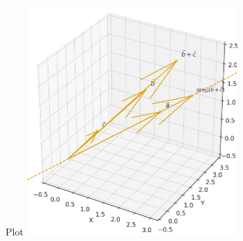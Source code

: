 \documentclass{beamer}
\begin{document}
\begin{frame}{Plot}
    \centering
    \includegraphics[width=\columnwidth, height=0.8\textheight, keepaspectratio]{4.8.32.png}     
\end{frame}
\end{document}
